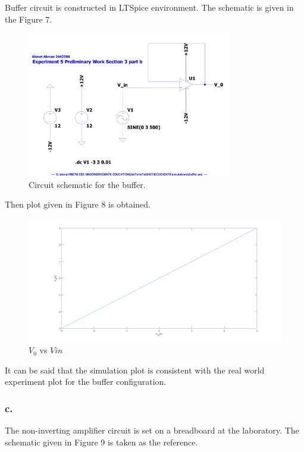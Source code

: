 \documentclass[letterpaper,12pt]{article}
\begin{document}
Buffer circuit is constructed in LTSpice environment. The schematic is given in the Figure 7.
\begin{figure}[H]
	\centering
   \includegraphics[width=0.8\textwidth]{Buffer_SCH.pdf}
   \caption{Circuit schematic for the buffer.}
\end{figure} 
Then plot given in Figure 8 is obtained.

\begin{figure}[H]
	\centering
   \includegraphics[width=1\textwidth]{3b_vs_vin.png}
   \caption{\(V_0\) vs \(V{in}\)}
\end{figure}
It can be said that the simulation plot is consistent with the real world experiment plot for the buffer configuration.
\subsubsection{c.}
The non-inverting amplifier circuit is set on a breadboard at the laboratory. The schematic given in Figure 9 is taken as the reference.  
\end{document}
